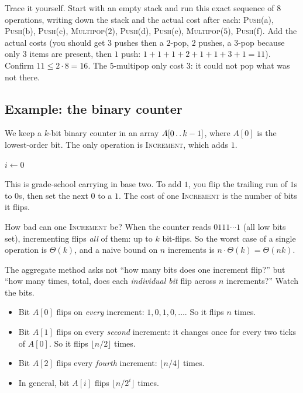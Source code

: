 \begin{labbox}
Trace it yourself. Start with an empty stack and run this exact sequence of $8$
operations, writing down the stack and the actual cost after each:
\textsc{Push}(a), \textsc{Push}(b), \textsc{Push}(c),
\textsc{Multipop}($2$), \textsc{Push}(d), \textsc{Push}(e),
\textsc{Multipop}($5$), \textsc{Push}(f).
Add the actual costs (you should get $3$ pushes then a $2$-pop, $2$ pushes, a
$3$-pop because only $3$ items are present, then $1$ push: $1+1+1+2+1+1+3+1 = 11$).
Confirm $11 \le 2 \cdot 8 = 16$. The $5$-multipop only cost $3$: it could
not pop what was not there.
\end{labbox}

\subsection{Example: the binary counter}

We keep a $k$-bit binary counter in an array $A[0 \mathinner{\ldotp\ldotp} k-1]$, where $A[0]$
is the lowest-order bit. The only operation is \textsc{Increment}, which adds $1$.

\begin{algorithm}[H]
\caption{\textsc{Increment}($A$)}
$i \leftarrow 0$\;
\end{algorithm}

This is grade-school carrying in base two. To add $1$, you flip the trailing
run of $1$s to $0$s, then set the next $0$ to a $1$. The cost of one
\textsc{Increment} is the number of bits it flips.

How bad can one \textsc{Increment} be? When the counter reads $0111\cdots1$ (all
low bits set), incrementing flips \emph{all} of them: up to $k$ bit-flips. So the
worst case of a single operation is $\Theta(k)$, and a naive bound on $n$
increments is $n \cdot \Theta(k) = \Theta(nk)$.

The aggregate method asks not ``how many bits does one increment flip?'' but
``how many times, total, does each \emph{individual bit} flip across $n$
increments?'' Watch the bits.

\begin{itemize}
  \item Bit $A[0]$ flips on \emph{every} increment: $1,0,1,0,\ldots$. So it flips
        $n$ times.
  \item Bit $A[1]$ flips on every \emph{second} increment: it changes once for
        every two ticks of $A[0]$. So it flips $\lfloor n/2 \rfloor$ times.
  \item Bit $A[2]$ flips every \emph{fourth} increment: $\lfloor n/4 \rfloor$
        times.
  \item In general, bit $A[i]$ flips $\lfloor n / 2^i \rfloor$ times.
\end{itemize}

